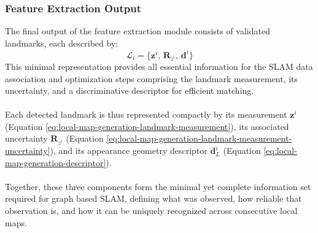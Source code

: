 \subsubsection{Feature Extraction Output}
The final output of the feature extraction module consists of validated landmarks, each described by:
$$
    \mathcal{L}_i = \{\mathbf{z}^i,\, \mathbf{R}_{z^i},\, \mathbf{d}^i\}
$$
This minimal representation provides all essential information for the SLAM data association and optimization steps comprising the landmark measurement, its uncertainty, and a discriminative descriptor for efficient matching.  
\\ \\
Each detected landmark is thus represented compactly by its measurement $\mathbf{z}^i$ (Equation \ref{eq:local-map-generation-landmark-measurement}), its associated uncertainty $\mathbf{R}_{z^i}$ (Equation \ref{eq:local-map-generation-landmark-measurement-uncertainty}), and its appearance geometry descriptor $\mathbf{d}_L^i$ (Equation \ref{eq:local-map-generation-descriptor}).
\\ \\
Together, these three components form the minimal yet complete information set required for graph based SLAM, defining what was observed, how reliable that observation is, and how it can be uniquely recognized across consecutive local maps.
